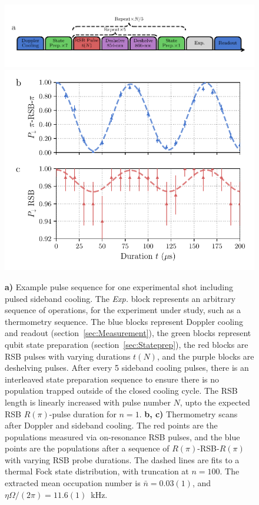     \begin{figure}
        \begin{center}
        \noindent\includegraphics[width=\linewidth]{
            figures/pdf_figure/pulse_sequence.pdf
            }
        \noindent\includegraphics[width=0.75\linewidth]{
            figures/pdf_figure/sideband_thermometry.pdf
            }

        \end{center}
        \caption{
            \textbf{a)} Example pulse sequence for one experimental shot including pulsed sideband cooling. The \emph{Exp.} block represents an arbitrary sequence of operations, for the experiment under study, such as a thermometry sequence.
            The blue blocks represent Doppler cooling and readout (section~\ref{sec:Measurement}), the green blocks represent qubit state preparation (section~\ref{sec:Stateprep}), the red blocks are RSB pulses with varying durations $t(N)$, and the purple blocks are deshelving pulses. After every 5 sideband cooling pulses, there is an interleaved state preparation sequence to ensure there is no population trapped outside of the closed cooling cycle. The RSB length is linearly increased with pulse number $N$, upto the expected RSB $R(\pi)$-pulse duration for $n=1$.  
            \textbf{b, c)} Thermometry scans after Doppler and sideband cooling. The red points are the populations measured via on-resonance RSB pulses, and the blue points are the populations after a sequence of $R(\pi)$-RSB-$R(\pi)$ with varying RSB probe durations. The dashed lines are fits to a thermal Fock state distribution, with truncation at $n = 100$. The extracted mean occupation number is $\bar{n} = 0.03(1)$, and $\eta\Omega/(2\pi) = 11.6(1)$~\unit{\kHz}. 
            }
        \label{fig:SBC}
    \end{figure}
